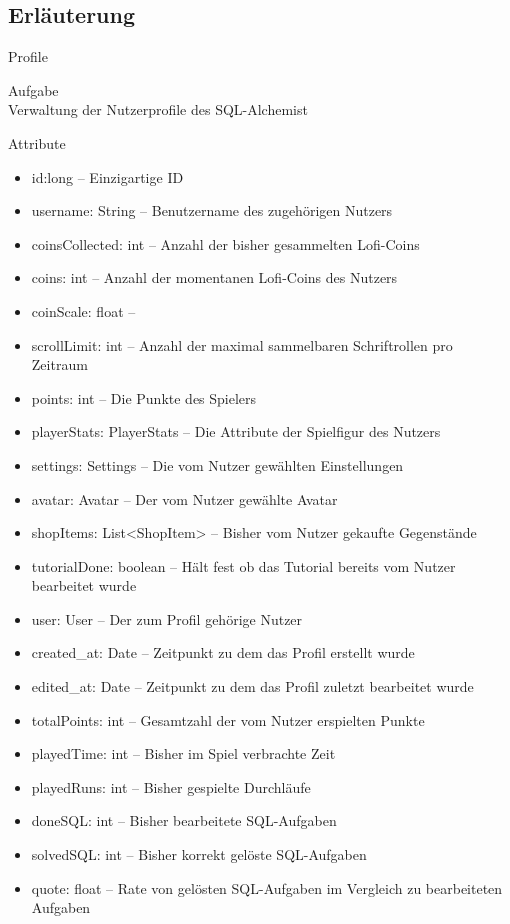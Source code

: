 \subsection{Erläuterung}
\begin{class}{10}{Profile}
\item[Aufgabe]~\\
Verwaltung der Nutzerprofile des SQL-Alchemist
\item[Attribute]~\\
\begin{itemize}
\item id:long -- Einzigartige ID
\item username: String -- Benutzername des zugehörigen Nutzers
\item coinsCollected: int -- Anzahl der bisher gesammelten Lofi-Coins
\item coins: int -- Anzahl der momentanen Lofi-Coins des Nutzers
\item coinScale: float -- 
\item scrollLimit: int -- Anzahl der maximal sammelbaren Schriftrollen pro Zeitraum
\item points: int -- Die Punkte des Spielers
\item playerStats: PlayerStats -- Die Attribute der Spielfigur des Nutzers
\item settings: Settings -- Die vom Nutzer gewählten Einstellungen
\item avatar: Avatar -- Der vom Nutzer gewählte Avatar
\item shopItems: List<ShopItem> -- Bisher vom Nutzer gekaufte Gegenstände
\item tutorialDone: boolean -- Hält fest ob das Tutorial bereits vom Nutzer bearbeitet wurde
\item user: User -- Der zum Profil gehörige Nutzer
\item created\_at: Date -- Zeitpunkt zu dem das Profil erstellt wurde
\item edited\_at: Date -- Zeitpunkt zu dem das Profil zuletzt bearbeitet wurde
\item totalPoints: int -- Gesamtzahl der vom Nutzer erspielten Punkte
\item playedTime: int -- Bisher im Spiel verbrachte Zeit
\item playedRuns: int -- Bisher gespielte Durchläufe
\item doneSQL: int -- Bisher bearbeitete SQL-Aufgaben
\item solvedSQL: int -- Bisher korrekt gelöste SQL-Aufgaben
\item quote: float -- Rate von gelösten SQL-Aufgaben im Vergleich zu bearbeiteten Aufgaben

\end{itemize}
\end{class}
